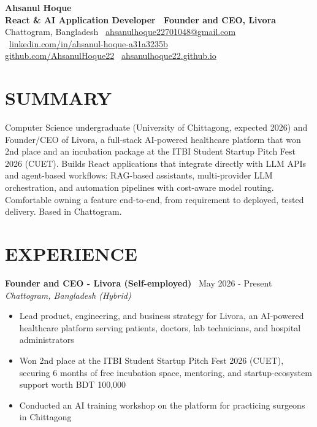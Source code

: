 \documentclass[10.5pt,a4paper]{article}
\newenvironment{tightitemize}{
  \begin{itemize}[leftmargin=15pt, itemsep=1pt, parsep=0pt, topsep=2pt]
}{
  \end{itemize}
}
\newcommand{\entry}[3]{%
  \textbf{#1} \textbar\ #2\\
  \textit{#3}%
}
\begin{document}
{\huge \bfseries Ahsanul Hoque}\\[2pt]
{\bfseries React \& AI Application Developer \textbar\ Founder and CEO, Livora}\\[5pt]
{\small
  Chattogram, Bangladesh \textbar\
  \href{mailto:ahsanulhoque22701048@gmail.com}{ahsanulhoque22701048@gmail.com} \textbar\
  \href{https://linkedin.com/in/ahsanul-hoque-a31a3235b}{linkedin.com/in/ahsanul-hoque-a31a3235b} \textbar\\
  \href{https://github.com/AhsanulHoque22}{github.com/AhsanulHoque22} \textbar\
  \href{https://ahsanulhoque22.github.io}{ahsanulhoque22.github.io}
}

\section*{SUMMARY}
Computer Science undergraduate (University of Chittagong, expected 2026) and Founder/CEO of Livora, a full-stack AI-powered healthcare platform that won 2nd place and an incubation package at the ITBI Student Startup Pitch Fest 2026 (CUET). Builds React applications that integrate directly with LLM APIs and agent-based workflows: RAG-based assistants, multi-provider LLM orchestration, and automation pipelines with cost-aware model routing. Comfortable owning a feature end-to-end, from requirement to deployed, tested delivery. Based in Chattogram.

\section*{EXPERIENCE}

\entry{Founder and CEO - Livora (Self-employed)}{May 2026 - Present}{Chattogram, Bangladesh (Hybrid)}
\begin{tightitemize}
  \item Lead product, engineering, and business strategy for Livora, an AI-powered healthcare platform serving patients, doctors, lab technicians, and hospital administrators
  \item Won 2nd place at the ITBI Student Startup Pitch Fest 2026 (CUET), securing 6 months of free incubation space, mentoring, and startup-ecosystem support worth BDT 100,000
  \item Conducted an AI training workshop on the platform for practicing surgeons in Chittagong
\end{tightitemize}
\end{document}
